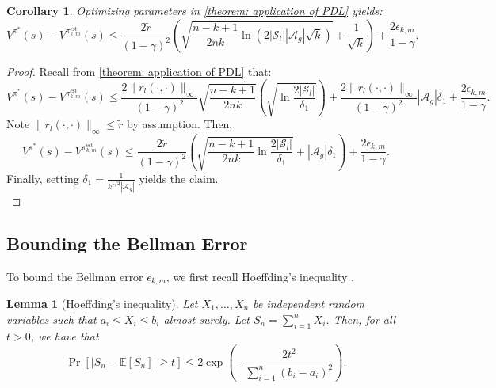 \documentclass{article}
\theoremstyle{plain}
\newtheorem{lemma}[theorem]{Lemma}
\newtheorem{corollary}[theorem]{Corollary}
\theoremstyle{definition}
\def\est{\mathrm{est}}
\def\E{\mathbb{E}}
\begin{document}
\begin{corollary}\emph{Optimizing parameters in \cref{theorem: application of PDL} yields}:
\label{corollary: performance_difference_lemma_applied}
\[V^{\pi^*}(s) - V^{{{\pi}}^\est_{k,m}}(s) \leq \frac{2\tilde{r}}{(1-\gamma)^2}\left(\sqrt{\frac{n-k+1}{2nk} \ln(2|\mathcal{S}_l||\mathcal{A}_g|\sqrt{k})} +  \frac{1}{\sqrt{k}}\right) + \frac{2\epsilon_{k,m}}{1-\gamma}.\]
\end{corollary}
\begin{proof} Recall from \cref{theorem: application of PDL} that:
    \[V^{\pi^*}(s) - V^{{{\pi}}^\est_{k,m}}(s) \leq \frac{2\|r_l(\cdot,\cdot)\|_\infty}{(1-\gamma)^2}\sqrt{\frac{n-k+1}{2nk}}\left(\sqrt{\ln \frac{2|\mathcal{S}_l|}{\delta_1}}\right) +  \frac{2\|r_l(\cdot,\cdot)\|_\infty}{(1-\gamma)^2}|\mathcal{A}_g|\delta_1+ \frac{2\epsilon_{k,m}}{1-\gamma}.\] 
    Note $\|r_l(\cdot,\cdot)\|_\infty \leq \tilde{r}$ by assumption. Then,
    \[V^{\pi^*}(s) - V^{{{\pi}}^\est_{k,m}}(s) \leq \frac{2\tilde{r}}{(1-\gamma)^2}\left(\sqrt{\frac{n-k+1}{2nk} \ln\frac{2|\mathcal{S}_l|}{\delta_1}} +  |\mathcal{A}_g|\delta_1\right) + \frac{2\epsilon_{k,m}}{1-\gamma}.\]
Finally, setting $\delta_1 = \frac{1}{k^{1/2}|\mathcal{A}_g|}$ yields the claim.\qedhere \\
\end{proof}

\subsection{Bounding the Bellman Error}

To bound the Bellman error $\epsilon_{k,m}$, we first recall Hoeffding's inequality \cite{409cf137-dbb5-3eb1-8cfe-0743c3dc925f}. 

\begin{lemma}
    [Hoeffding's inequality]
    Let $X_1, \dots, X_n$ be independent random variables such that $a_i \leq X_i \leq b_i$ almost surely. Let $S_n = \sum_{i=1}^n X_i$. Then, for all $t>0$, we have that
    \[\Pr[|S_n - \E[S_n]| \geq t] \leq 2\exp\left(-\frac{2t^2}{\sum_{i=1}^n (b_i-a_i)^2}\right).\]
\end{lemma}
\end{document}
